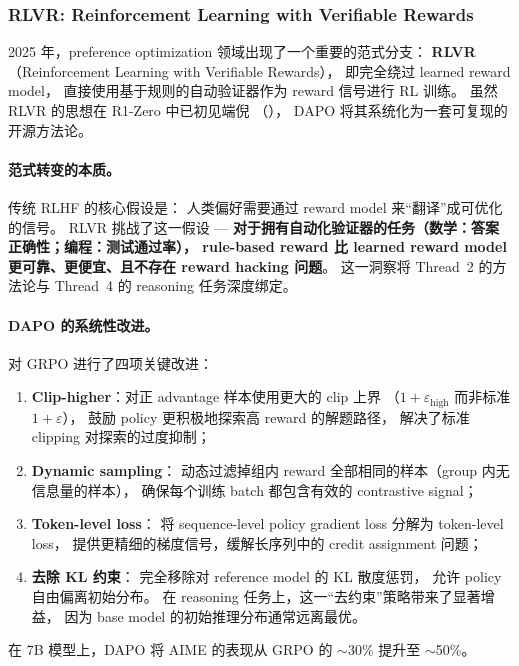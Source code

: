 \subsubsection{RLVR: Reinforcement Learning with Verifiable Rewards}
\label{sec:t2-rlvr}

2025 年，preference optimization 领域出现了一个重要的范式分支：
\textbf{RLVR}（Reinforcement Learning with Verifiable Rewards），
即完全绕过 learned reward model，
直接使用基于规则的自动验证器作为 reward 信号进行 RL 训练。
虽然 RLVR 的思想在 R1-Zero \cite{deepseek2025r1} 中已初见端倪
（），
DAPO \cite{yu2025dapo} 将其系统化为一套可复现的开源方法论。

\paragraph{范式转变的本质。}
传统 RLHF 的核心假设是：
人类偏好需要通过 reward model 来``翻译''成可优化的信号。
RLVR 挑战了这一假设 ---
\textbf{对于拥有自动化验证器的任务（数学：答案正确性；编程：测试通过率），
rule-based reward 比 learned reward model 更可靠、更便宜、且不存在 reward hacking 问题}。
这一洞察将 Thread~2 的方法论与 Thread~4 的 reasoning 任务深度绑定。

\paragraph{DAPO 的系统性改进。}
 对 GRPO 进行了四项关键改进：
\begin{enumerate}[leftmargin=2em]
  \item \textbf{Clip-higher}：对正 advantage 样本使用更大的 clip 上界
    （$1 + \varepsilon_{\text{high}}$ 而非标准 $1 + \varepsilon$），
    鼓励 policy 更积极地探索高 reward 的解题路径，
    解决了标准 clipping 对探索的过度抑制；
  \item \textbf{Dynamic sampling}：
    动态过滤掉组内 reward 全部相同的样本（group 内无信息量的样本），
    确保每个训练 batch 都包含有效的 contrastive signal；
  \item \textbf{Token-level loss}：
    将 sequence-level policy gradient loss 分解为 token-level loss，
    提供更精细的梯度信号，缓解长序列中的 credit assignment 问题；
  \item \textbf{去除 KL 约束}：
    完全移除对 reference model 的 KL 散度惩罚，
    允许 policy 自由偏离初始分布。
    在 reasoning 任务上，这一``去约束''策略带来了显著增益，
    因为 base model 的初始推理分布通常远离最优。
\end{enumerate}
在 7B 模型上，DAPO 将 AIME 的表现从 GRPO 的 $\sim$30\% 提升至 $\sim$50\%。

